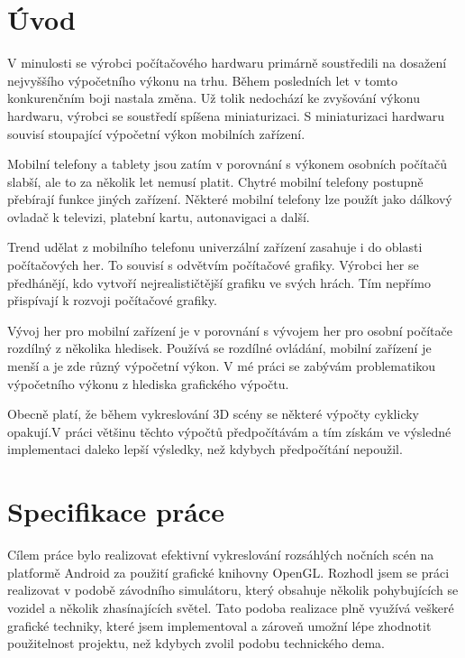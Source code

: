 \documentclass[11pt,twoside,a4paper]{book}
\begin{document}
\chapter{Úvod}
V minulosti se výrobci počítačového hardwaru primárně soustředili na dosažení nejvyššího výpočetního výkonu na trhu. Během posledních let v tomto konkurenčním boji nastala změna. Už tolik nedochází ke zvyšování výkonu hardwaru, výrobci se soustředí spíše\linebreak na miniaturizaci. S miniaturizaci hardwaru souvisí stoupající výpočetní výkon mobilních zařízení. 

Mobilní telefony a tablety jsou zatím v porovnání s výkonem osobních počítačů slabší, ale to za několik let nemusí platit. Chytré mobilní telefony postupně přebírají funkce jiných zařízení. Některé mobilní telefony lze použít jako dálkový ovladač k televizi, platební kartu, autonavigaci a další.

Trend udělat z mobilního telefonu univerzální zařízení zasahuje i do oblasti počítačových her. To souvisí s odvětvím počítačové grafiky. Výrobci her se předhánějí, kdo vytvoří nejrealističtější grafiku ve svých hrách. Tím nepřímo přispívají k rozvoji počítačové grafiky.

Vývoj her pro mobilní zařízení je v porovnání s vývojem her pro osobní počítače rozdílný z několika hledisek. Používá se rozdílné ovládání, mobilní zařízení je menší a je zde různý výpočetní výkon. V mé práci se zabývám problematikou výpočetního výkonu z hlediska grafického výpočtu.

Obecně platí, že během vykreslování 3D scény se některé výpočty cyklicky opakují.\linebreak V práci většinu těchto výpočtů předpočítávám a tím získám ve výsledné implementaci daleko lepší výsledky, než kdybych předpočítání nepoužil.

\chapter{Specifikace práce}
Cílem práce bylo realizovat efektivní vykreslování rozsáhlých nočních scén na platformě Android za použití grafické knihovny OpenGL. Rozhodl jsem se práci realizovat v podobě závodního simulátoru, který obsahuje několik pohybujících se vozidel a několik zhasínajících světel. Tato podoba realizace plně využívá veškeré grafické techniky, které jsem implementoval a zároveň umožní lépe zhodnotit použitelnost projektu, než kdybych zvolil podobu technického dema.
\end{document}
